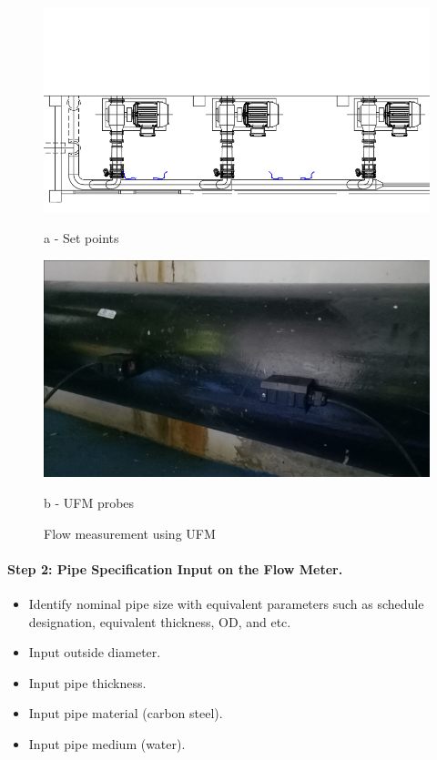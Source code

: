 \begin{figure}[ht]
	\begin{minipage}[b]{0.5\linewidth}
		\centering
		\includegraphics[width=\textwidth]{figures/ch02_flowmeasurement01}
		\caption{a - Set points}
		\label{ch02_flowmeasurement01}
    \end{minipage}
    \hspace{0.05cm}
    \begin{minipage}[b]{0.5\linewidth}
		\centering
		\includegraphics[width=\textwidth]{figures/ch02_flowmeasurement02}
		\caption{b - UFM probes}
    \end{minipage}
	\caption{Flow measurement using UFM}
	\label{ch02_flowmeasurement02}
\end{figure}



\paragraph{Step 2: Pipe Specification Input on the Flow Meter.}
\begin{itemize}
\item Identify nominal pipe size with equivalent parameters such as schedule designation, equivalent thickness, OD, and etc.
\item Input outside diameter.
\item Input pipe thickness.
\item Input pipe material (carbon steel).
\item Input pipe medium (water).

\end{itemize}

